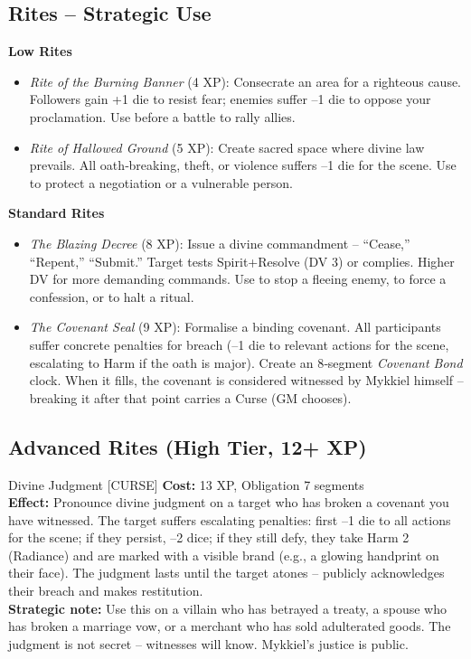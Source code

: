 \documentclass[10pt,a5paper]{book}
\begin{document}
\subsection*{Rites – Strategic Use}

\textbf{Low Rites}
\begin{itemize}
    \item \textit{Rite of the Burning Banner} (4 XP): Consecrate an area for a righteous cause. Followers gain +1 die to resist fear; enemies suffer –1 die to oppose your proclamation. Use before a battle to rally allies.
    \item \textit{Rite of Hallowed Ground} (5 XP): Create sacred space where divine law prevails. All oath‑breaking, theft, or violence suffers –1 die for the scene. Use to protect a negotiation or a vulnerable person.
\end{itemize}

\textbf{Standard Rites}
\begin{itemize}
    \item \textit{The Blazing Decree} (8 XP): Issue a divine commandment – “Cease,” “Repent,” “Submit.” Target tests Spirit+Resolve (DV 3) or complies. Higher DV for more demanding commands. Use to stop a fleeing enemy, to force a confession, or to halt a ritual.
    \item \textit{The Covenant Seal} (9 XP): Formalise a binding covenant. All participants suffer concrete penalties for breach (–1 die to relevant actions for the scene, escalating to Harm if the oath is major). Create an 8‑segment \textit{Covenant Bond} clock. When it fills, the covenant is considered witnessed by Mykkiel himself – breaking it after that point carries a Curse (GM chooses).
\end{itemize}

\subsection*{Advanced Rites (High Tier, 12+ XP)}

\begin{patronbox}{Divine Judgment [CURSE]}
\textbf{Cost:} 13 XP, Obligation 7 segments \\
\textbf{Effect:} Pronounce divine judgment on a target who has broken a covenant you have witnessed. The target suffers escalating penalties: first –1 die to all actions for the scene; if they persist, –2 dice; if they still defy, they take Harm 2 (Radiance) and are marked with a visible brand (e.g., a glowing handprint on their face). The judgment lasts until the target atones – publicly acknowledges their breach and makes restitution. \\
\textbf{Strategic note:} Use this on a villain who has betrayed a treaty, a spouse who has broken a marriage vow, or a merchant who has sold adulterated goods. The judgment is not secret – witnesses will know. Mykkiel’s justice is public.
\end{patronbox}
\end{document}
